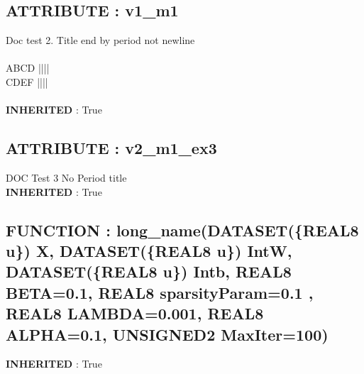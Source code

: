 \subsection*{ATTRIBUTE : v1\_m1}
\hypertarget{ecldoc:intest.inintest.example_4_example_3.mod_1.v1_m1}{}
Doc test 2. Title end by period not newline  \\
 \\
 ABCD |||| \\
 CDEF |||| \\
 \\
\textbf{INHERITED} : True \\
\subsection*{ATTRIBUTE : v2\_m1\_ex3}
\hypertarget{ecldoc:intest.inintest.example_4_example_3.mod_1.v2_m1_ex3}{}
DOC Test 3 No Period title \\
\textbf{INHERITED} : True \\
\subsection*{FUNCTION : long\_name(DATASET(\{REAL8 u\}) X, DATASET(\{REAL8 u\}) IntW, DATASET(\{REAL8 u\}) Intb, REAL8 BETA=0.1, REAL8 sparsityParam=0.1 , REAL8 LAMBDA=0.001, REAL8 ALPHA=0.1, UNSIGNED2 MaxIter=100)}
\hypertarget{ecldoc:intest.inintest.example_4_example_3.mod_1.long_name}{}
\textbf{INHERITED} : True \\



